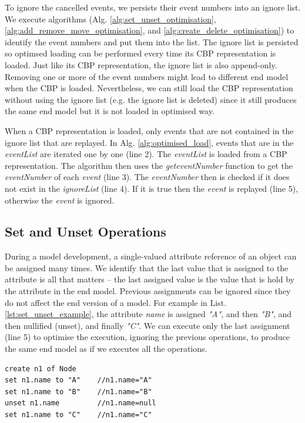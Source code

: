 \documentclass{llncs}
\begin{document}
To ignore the cancelled events, we persists their event numbers into an ignore list. We execute algorithms (Alg. \ref{alg:set_unset_optimisation}, \ref{alg:add_remove_move_optimisation}, and  \ref{alg:create_delete_optimisation}) to identify the event numbers and put them into the list. The ignore list is persisted so optimsed loading can be performed every time its CBP representation is loaded. Just like its CBP representation, the ignore list is also append-only. Removing one or more of the event numbers might lead to different end model when the CBP is loaded. Nevertheless, we can still load the CBP representation without using the ignore list (e.g. the ignore list is deleted) since it still produces the same end model but it is not loaded in optimised way. 

When a CBP representation is loaded, only events that are not contained in the ignore list that are replayed. In Alg. \ref{alg:optimised_load}, events that are in the \emph{eventList} are iterated one by one (line 2). The \emph{eventList} is loaded from a CBP representation. The algorithm then uses the \emph{geteventNumber} function to get the \emph{eventNumber} of each \emph{event} (line 3). The \emph{eventNumber} then is checked if it does not exist in the \emph{ignoreList} (line 4). If it is true then the \emph{event} is replayed (line 5), otherwise the \emph{event} is ignored.      

\subsection{Set and Unset Operations}
\label{subsec:set_and_unset_operations}
During a model development, a single-valued attribute reference of an object can be assigned many times. We identify that the last value that is assigned to the attribute is all that matters -- the last assigned value is the value that is hold by the attribute in the end model. Previous assignments can be ignored since they do not affect the end version of a model. For example in List. \ref{lst:set_unset_example}, the attribute \emph{name} is assigned \emph{"A"}, and then \emph{"B"}, and then nullified (unset), and finally \emph{"C"}. We can execute only the last assignment (line 5) to optimise the execution, ignoring the previous operations, to produce the same end model as if we executes all the operations. 

\begin{lstlisting}[style=eol,caption={Example of CBP representation of \emph{name} attribute assignments.},label=lst:set_unset_example]
create n1 of Node
set n1.name to "A"    //n1.name="A"    
set n1.name to "B"    //n1.name="B"
unset n1.name         //n1.name=null
set n1.name to "C"    //n1.name="C"
\end{lstlisting}
\end{document}
